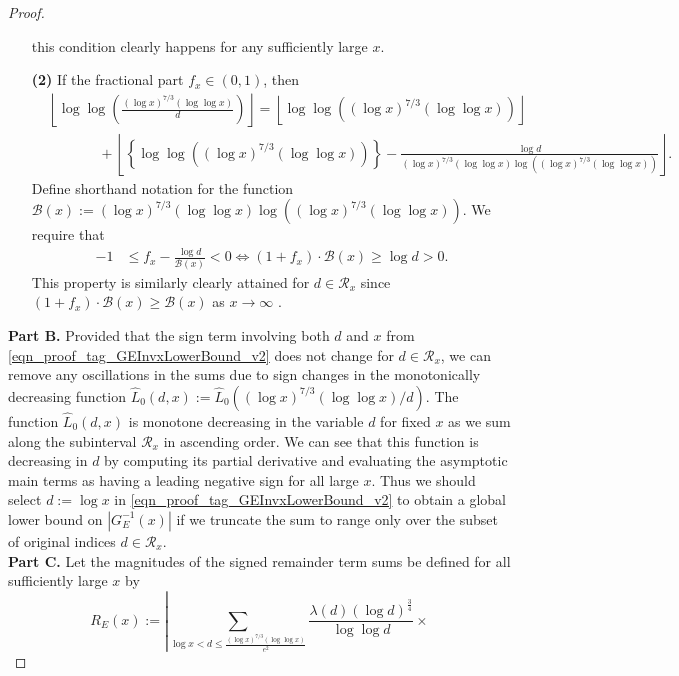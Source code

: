 \documentclass[11pt,reqno,a4letter]{article}
\numberwithin{figure}{section}
\numberwithin{table}{section}
\newcommand{\floor}[1]{\left\lfloor #1 \right\rfloor}
\theoremstyle{plain}
\numberwithin{theorem}{section}
\theoremstyle{definition}
\begin{document}
\begin{proof}
\begin{itemize}[itemsep=0pt,topsep=0pt,leftmargin=0.35in]
     this condition clearly happens for any sufficiently large $x$. 
\item[\textbf{(2)}] If the fractional part $f_x \in (0, 1)$, then 
     \begin{align*} 
     & \floor{\log\log\left(\frac{(\log x)^{7/3} (\log\log x)}{d}\right)} = 
          \floor{\log\log\left((\log x)^{7/3} (\log\log x)\right)} \\ 
          & \phantom{\qquad =\ } + 
          \floor{\left\{\log\log\left((\log x)^{7/3} (\log\log x)\right)\right\} - 
          \frac{\log d}{(\log x)^{7/3} (\log\log x) \log\left( 
          (\log x)^{7/3} (\log\log x)\right)}}. 
     \end{align*} 
     Define shorthand notation for the function 
     $\mathcal{B}(x) := (\log x)^{7/3} (\log\log x) \log\left((\log x)^{7/3} (\log\log x)\right)$. 
     We require that 
     \begin{align*} 
     -1 & \leq f_x - \frac{\log d}{\mathcal{B}(x)} < 0 \iff 
          (1 + f_x) \cdot \mathcal{B}(x) \geq \log d > 0. 
     \end{align*} 
     This property is similarly clearly attained for $d \in \mathcal{R}_x$ 
     since $(1 + f_x) \cdot \mathcal{B}(x) \geq \mathcal{B}(x)$ 
     as $x \rightarrow \infty$ . 
\end{itemize} 
\textbf{Part B.} 
Provided that the sign term involving both $d$ and $x$ 
from \eqref{eqn_proof_tag_GEInvxLowerBound_v2} does not change for 
$d \in \mathcal{R}_x$, 
we can remove any oscillations in the sums due to sign changes in the monotonically 
decreasing function 
$\widehat{L}_0(d, x) := \widehat{L}_0\left((\log x)^{7/3} (\log\log x)/d\right)$. 
The function $\widehat{L}_0(d, x)$ is monotone decreasing 
in the variable $d$ for fixed $x$ as we sum along the 
subinterval $\mathcal{R}_x$ in ascending order. 
We can see that this function is decreasing 
in $d$ by computing its partial derivative and 
evaluating the asymptotic main terms as having a leading negative sign 
for all large $x$. 
Thus we should select $d := \log x$ in 
\eqref{eqn_proof_tag_GEInvxLowerBound_v2} to 
obtain a global lower bound on $|G_E^{-1}(x)|$ if we truncate the sum 
to range only over the subset of original indices $d \in \mathcal{R}_x$. \\ 
\textbf{Part C.} 
Let the magnitudes of the signed remainder term sums be 
defined for all sufficiently large $x$ by 
\[
R_E(x) := \left\lvert \sum_{\log x < d \leq \frac{(\log x)^{7/3} (\log\log x)}{e^2}} 
     \frac{\lambda(d) (\log d)^{\frac{3}{4}}}{\log\log d} \times 
\]
\end{proof}
\end{document}
